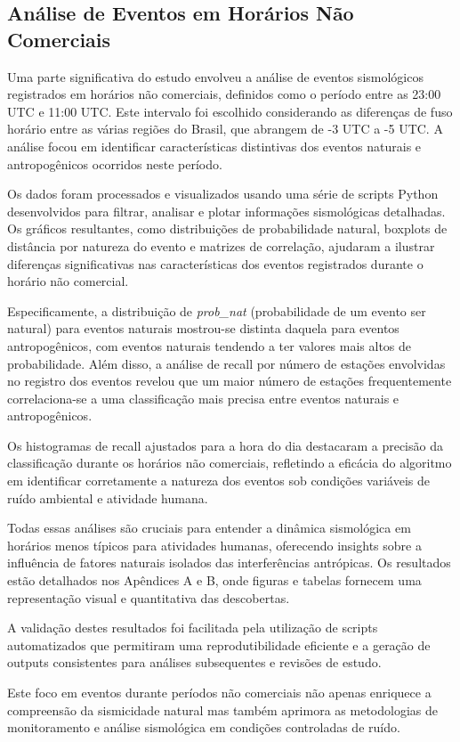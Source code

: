 \subsection{Análise de Eventos em Horários Não Comerciais}
\label{subsec:nao_comerciais}


\par{Uma parte significativa do estudo envolveu a análise de eventos sismológicos registrados em horários não comerciais, definidos como o período entre as 23:00 UTC e 11:00 UTC. Este intervalo foi escolhido considerando as diferenças de fuso horário entre as várias regiões do Brasil, que abrangem de -3 UTC a -5 UTC. A análise focou em identificar características distintivas dos eventos naturais e antropogênicos ocorridos neste período.}

\par{Os dados foram processados e visualizados usando uma série de scripts Python desenvolvidos para filtrar, analisar e plotar informações sismológicas detalhadas. Os gráficos resultantes, como distribuições de probabilidade natural, boxplots de distância por natureza do evento e matrizes de correlação, ajudaram a ilustrar diferenças significativas nas características dos eventos registrados durante o horário não comercial.}

\par{Especificamente, a distribuição de \textit{prob\_nat} (probabilidade de um evento ser natural) para eventos naturais mostrou-se distinta daquela para eventos antropogênicos, com eventos naturais tendendo a ter valores mais altos de probabilidade. Além disso, a análise de recall por número de estações envolvidas no registro dos eventos revelou que um maior número de estações frequentemente correlaciona-se a uma classificação mais precisa entre eventos naturais e antropogênicos.}

\par{Os histogramas de recall ajustados para a hora do dia destacaram a precisão da classificação durante os horários não comerciais, refletindo a eficácia do algoritmo em identificar corretamente a natureza dos eventos sob condições variáveis de ruído ambiental e atividade humana.}

\par{Todas essas análises são cruciais para entender a dinâmica sismológica em horários menos típicos para atividades humanas, oferecendo insights sobre a influência de fatores naturais isolados das interferências antrópicas. Os resultados estão detalhados nos Apêndices A e B, onde figuras e tabelas fornecem uma representação visual e quantitativa das descobertas.}

\par{A validação destes resultados foi facilitada pela utilização de scripts automatizados que permitiram uma reprodutibilidade eficiente e a geração de outputs consistentes para análises subsequentes e revisões de estudo.}

\par{Este foco em eventos durante períodos não comerciais não apenas enriquece a compreensão da sismicidade natural mas também aprimora as metodologias de monitoramento e análise sismológica em condições controladas de ruído.}
